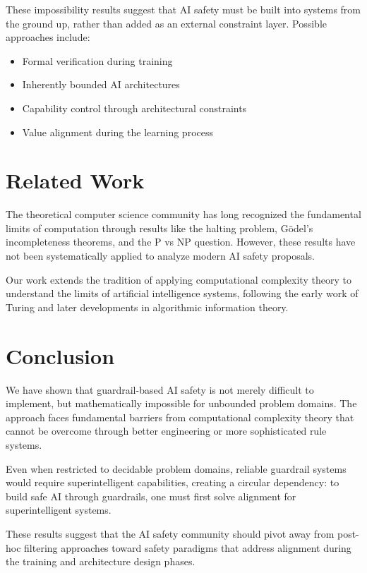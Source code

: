 \documentclass[11pt]{article}
\begin{document}
These impossibility results suggest that AI safety must be built into systems from the ground up, rather than added as an external constraint layer. Possible approaches include:

\begin{itemize}
    \item Formal verification during training
    \item Inherently bounded AI architectures
    \item Capability control through architectural constraints
    \item Value alignment during the learning process
\end{itemize}

\section{Related Work}

The theoretical computer science community has long recognized the fundamental limits of computation through results like the halting problem, Gödel's incompleteness theorems, and the P vs NP question. However, these results have not been systematically applied to analyze modern AI safety proposals.

Our work extends the tradition of applying computational complexity theory to understand the limits of artificial intelligence systems, following the early work of Turing and later developments in algorithmic information theory.

\section{Conclusion}

We have shown that guardrail-based AI safety is not merely difficult to implement, but mathematically impossible for unbounded problem domains. The approach faces fundamental barriers from computational complexity theory that cannot be overcome through better engineering or more sophisticated rule systems.

Even when restricted to decidable problem domains, reliable guardrail systems would require superintelligent capabilities, creating a circular dependency: to build safe AI through guardrails, one must first solve alignment for superintelligent systems.

These results suggest that the AI safety community should pivot away from post-hoc filtering approaches toward safety paradigms that address alignment during the training and architecture design phases.
\end{document}
